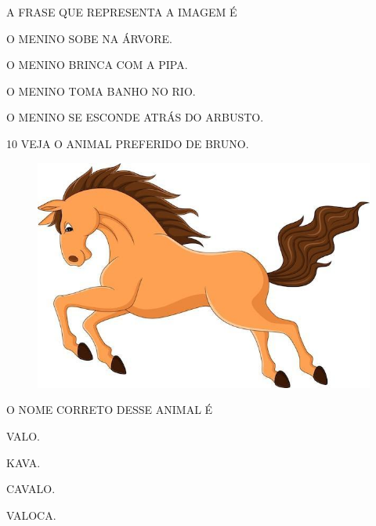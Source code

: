 A FRASE QUE REPRESENTA A IMAGEM É

\begin{escolha}[itemsep=-5pt]
\item O MENINO SOBE NA ÁRVORE.

\item O MENINO BRINCA COM A PIPA.

\item O MENINO TOMA BANHO NO RIO.

\item O MENINO SE ESCONDE ATRÁS DO ARBUSTO.
\end{escolha}


\num{10} VEJA O ANIMAL PREFERIDO DE BRUNO.

\begin{figure}[H]
\centering
\includegraphics[width=\textwidth]{media/image234.jpg}
\end{figure}


O NOME CORRETO DESSE ANIMAL É

\begin{escolha}
\item VALO.

\item KAVA.

\item CAVALO.

\item VALOCA.
\end{escolha}

